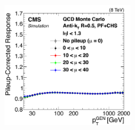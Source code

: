 \begin{frame}
{\begin{textblock}{.9}
\begin{figure}
				\includegraphics[width=0.5\textwidth]{images/Can1_noPreliminary.pdf} %
			\end{figure}
		\end{textblock}
	}
\end{frame}
